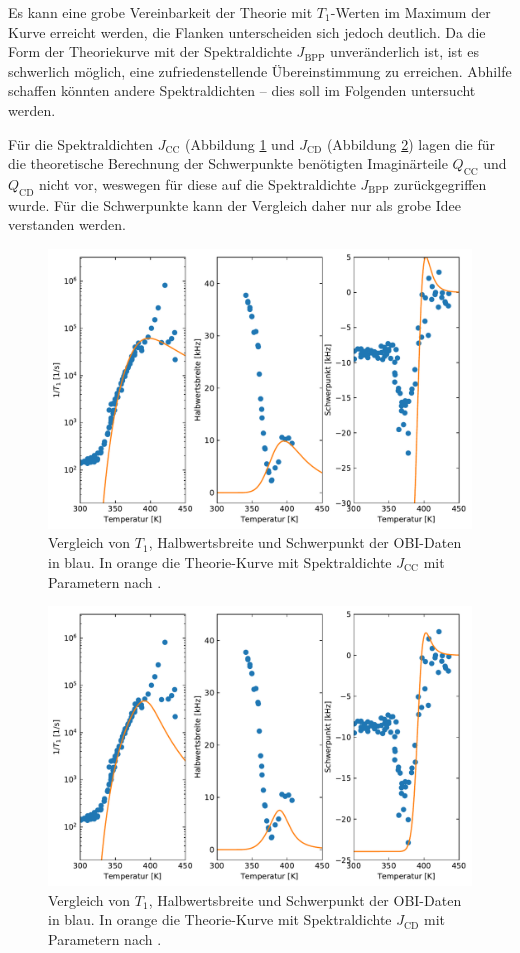 Es kann eine grobe Vereinbarkeit der Theorie mit $T_1$-Werten im Maximum der Kurve erreicht werden, die Flanken unterscheiden sich jedoch deutlich. Da die Form der Theoriekurve mit der Spektraldichte $J_\text{BPP}$ unveränderlich ist, ist es schwerlich möglich, eine zufriedenstellende Übereinstimmung zu erreichen. Abhilfe schaffen könnten andere Spektraldichten -- dies soll im Folgenden untersucht werden.

Für die Spektraldichten $J_\text{CC}$ (Abbildung \ref{fig:res:theorie_j_cc} und $J_\text{CD}$ (Abbildung \ref{fig:res:theorie_j_dc}) lagen die für die theoretische Berechnung der Schwerpunkte benötigten Imaginärteile $Q_\text{CC}$ und $Q_\text{CD}$ nicht vor, weswegen für diese auf die Spektraldichte $J_\text{BPP}$ zurückgegriffen wurde. Für die Schwerpunkte kann der Vergleich daher nur als grobe Idee verstanden werden.
\begin{figure}
	\begin{center}
		\includegraphics[width=.8\textwidth]{graphics/plot/OBI_J_cc_01.pdf}
	\end{center}
	\caption{Vergleich von $T_1$, Halbwertsbreite und Schwerpunkt der OBI-Daten in blau. In orange die Theorie-Kurve mit Spektraldichte $J_\text{CC}$ mit Parametern nach \cite{PIMENOV199793}.} \label{fig:res:theorie_j_cc}
\end{figure}
\begin{figure}
	\begin{center}
		\includegraphics[width=.8\textwidth]{graphics/plot/OBI_J_dc_01.pdf}
	\end{center}
	\caption{Vergleich von $T_1$, Halbwertsbreite und Schwerpunkt der OBI-Daten in blau. In orange die Theorie-Kurve mit Spektraldichte $J_\text{CD}$ mit Parametern nach \cite{PIMENOV199793}.} \label{fig:res:theorie_j_dc}
\end{figure}

